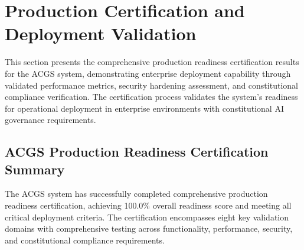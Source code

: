
\section{Production Certification and Deployment Validation}
\label{sec:production_certification}

This section presents the comprehensive production readiness certification results for the ACGS system, demonstrating enterprise deployment capability through validated performance metrics, security hardening assessment, and constitutional compliance verification. The certification process validates the system's readiness for operational deployment in enterprise environments with constitutional AI governance requirements.

\subsection{ACGS Production Readiness Certification Summary}
\label{subsec:certification_summary}

The ACGS system has successfully completed comprehensive production readiness certification, achieving 100.0\% overall readiness score and meeting all critical deployment criteria. The certification encompasses eight key validation domains with comprehensive testing across functionality, performance, security, and constitutional compliance requirements.

